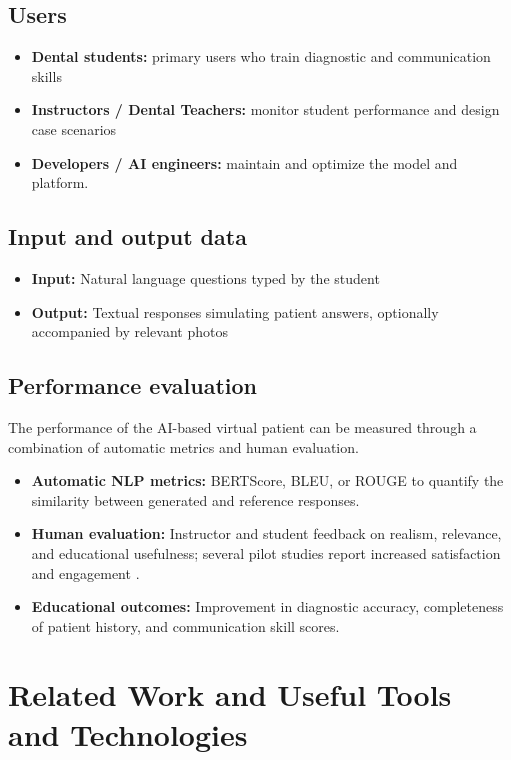 \documentclass[runningheads,a4paper,11pt]{report}
\begin{document}
\subsection{Users}

\begin{itemize}
  \item \textbf{Dental students:} primary users who train diagnostic and communication skills
  \item \textbf{Instructors / Dental Teachers:} monitor student performance and design case scenarios
  \item \textbf{Developers / AI engineers:} maintain and optimize the model and platform.
\end{itemize}

\subsection{Input and output data}

\begin{itemize}
  \item \textbf{Input:} Natural language questions typed by the student
  \item \textbf{Output:} Textual responses simulating patient answers, optionally accompanied by relevant photos
\end{itemize}

\subsection{Performance evaluation}

The performance of the AI-based virtual patient can be measured through a combination of automatic metrics and human evaluation.
\begin{itemize}
  \item \textbf{Automatic NLP metrics:} BERTScore, BLEU, or ROUGE to quantify the similarity between generated and reference responses.
  \item \textbf{Human evaluation:} Instructor and student feedback on realism, relevance, and educational usefulness; several pilot studies report increased satisfaction and engagement \cite{suarez2022, or2024}.
  \item \textbf{Educational outcomes:} Improvement in diagnostic accuracy, completeness of patient history, and communication skill scores.
\end{itemize}

\section{Related Work and Useful Tools and Technologies}
\end{document}
